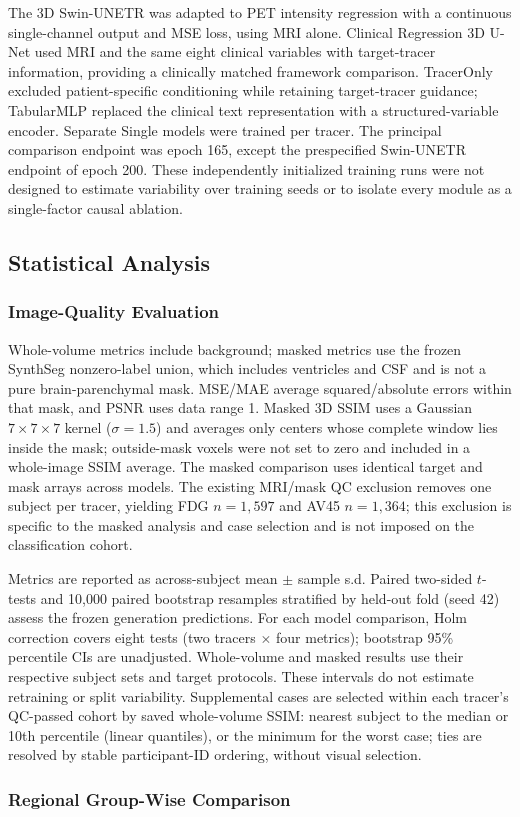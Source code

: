 \documentclass{article}
\providecommand{\DIFaddtex}[1]{{\protect\color{blue} \sf #1}} %
\providecommand{\DIFaddbegin}{} %
\providecommand{\DIFaddend}{} %
\providecommand{\DIFadd}[1]{\texorpdfstring{\DIFaddtex{#1}}{#1}} %
\newcommand{\DIFaddincludegraphics}[2][]{{\color{blue}\fbox{\DIFOincludegraphics[#1]{#2}}}} %
\DeclareRobustCommand{\DIFaddbegin}{\DIFOaddbegin \let\includegraphics\DIFaddincludegraphics} %
\DeclareRobustCommand{\DIFaddend}{\DIFOaddend \let\includegraphics\DIFOincludegraphics} %
\begin{document}
\DIFaddbegin \DIFadd{The 3D Swin-UNETR was adapted to PET intensity regression with a continuous single-channel output and MSE loss, using MRI alone. Clinical Regression 3D U-Net used MRI and the same eight clinical variables with target-tracer information, providing a clinically matched framework comparison. TracerOnly excluded patient-specific conditioning while retaining target-tracer guidance; TabularMLP replaced the clinical text representation with a structured-variable encoder. Separate Single models were trained per tracer. The principal comparison endpoint was epoch 165, except the prespecified Swin-UNETR endpoint of epoch 200. These independently initialized training runs were not designed to estimate variability over training seeds or to isolate every module as a single-factor causal ablation.
}

\DIFaddend \subsection{Statistical Analysis}
\DIFaddbegin \subsubsection{\DIFadd{Image-Quality Evaluation}}
\DIFadd{Whole-volume metrics include background; masked metrics use the frozen SynthSeg nonzero-label union, which includes ventricles and CSF and is not a pure brain-parenchymal mask. MSE/MAE average squared/absolute errors within that mask, and PSNR uses data range 1. Masked 3D SSIM uses a Gaussian $7\times7\times7$ kernel ($\sigma=1.5$) and averages only centers whose complete window lies inside the mask; outside-mask voxels were not set to zero and included in a whole-image SSIM average. The masked comparison uses identical target and mask arrays across models. The existing MRI/mask QC exclusion removes one subject per tracer, yielding FDG $n=1,597$ and AV45 $n=1,364$; this exclusion is specific to the masked analysis and case selection and is not imposed on the classification cohort.
}

\DIFadd{Metrics are reported as across-subject mean $\pm$ sample s.d. Paired two-sided $t$-tests and 10,000 paired bootstrap resamples stratified by held-out fold (seed 42) assess the frozen generation predictions. For each model comparison, Holm correction covers eight tests (two tracers $\times$ four metrics); bootstrap 95\% percentile CIs are unadjusted. Whole-volume and masked results use their respective subject sets and target protocols. These intervals do not estimate retraining or split variability. Supplemental cases are selected within each tracer's QC-passed cohort by saved whole-volume SSIM: nearest subject to the median or 10th percentile (linear quantiles), or the minimum for the worst case; ties are resolved by stable participant-ID ordering, without visual selection.
}\DIFaddend \subsubsection{Regional Group-Wise Comparison}
\end{document}
